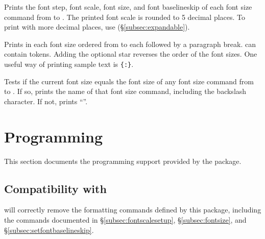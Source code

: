 \documentclass{beery}
\begin{document}
\begin{mydisplaycode}
\end{mydisplaycode}

Prints the font step, font scale, font size, and font baselineskip of each font size command from  to .
The printed font scale is rounded to \num{5} decimal places.
To print with more decimal places, use  (\S\ref{subsec:expandable}).

\begin{mydisplaycode}
   \sarg{} 
\end{mydisplaycode}

Prints  in each font size ordered from  to  each followed by a paragraph break.
 can contain  tokens.
Adding the optional star reverses the order of the font sizes.
One useful way of printing sample text is \allowbreak\texttt{\{:\allowbreak\textvisiblespace\allowbreak{}\}}.

\begin{mydisplaycode}
\end{mydisplaycode}

Tests if the current font size equals the font size of any font size command from  to .
If so, prints the name of that font size command, including the backslash character.
If not, prints \enquote{\string\undefined}.


\section{Programming}
\label{sec:programming}

This section documents the  programming support provided by the  package.

\subsection
  {%
    Compatibility with
    \texorpdfstring
      {}
      {\textbackslash{}text\_purify:n}%
  }
\label{subsec:textpurify}

 will correctly remove the formatting commands defined by this package, including the commands documented in \S\ref{subsec:fontscalesetup}, \S\ref{subsec:fontsize}, and \S\ref{subsec:setfontbaselineskip}.
\end{document}
